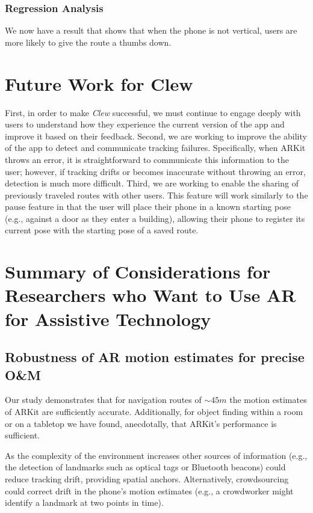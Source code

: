 \documentclass[chi_draft]{sigchi}
\newcommand{\OM}{O\&M\xspace}
\begin{document}

\subsubsection{Regression Analysis}

We now have a result that shows that when the phone is not vertical, users are more likely to give the route a thumbs down.



\section{Future Work for Clew}
First, in order to make \emph{Clew} successful, we must continue to engage deeply with users to understand how they experience the current version of the app and improve it based on their feedback. Second, we are working to improve the ability of the app to detect and communicate tracking failures.  Specifically, when ARKit throws an error, it is straightforward to communicate this information to the user; however, if tracking drifts or becomes inaccurate without throwing an error, detection is much more difficult. Third, we are working to enable the sharing of previously traveled routes with other users.  This feature will work similarly to the pause feature in that the user will place their phone in a known starting pose (e.g., against a door as they enter a building), allowing their phone to register its current pose with the starting pose of a saved route.


\section{Summary of Considerations for Researchers who Want to Use AR for Assistive Technology}

\subsection{Robustness of AR motion estimates for precise \OM} Our study demonstrates that for navigation routes of $\sim45m$ the motion estimates of ARKit are sufficiently accurate.  Additionally, for object finding within a room or on a tabletop we have found, anecdotally, that ARKit's performance is sufficient.

As the complexity of the environment increases other sources of information (e.g., the detection of landmarks such as optical tags or Bluetooth beacons) could reduce tracking drift, providing spatial anchors.  Alternatively, crowdsourcing could correct drift in the phone's motion estimates (e.g., a crowdworker might identify a landmark at two points in time).
\end{document}
